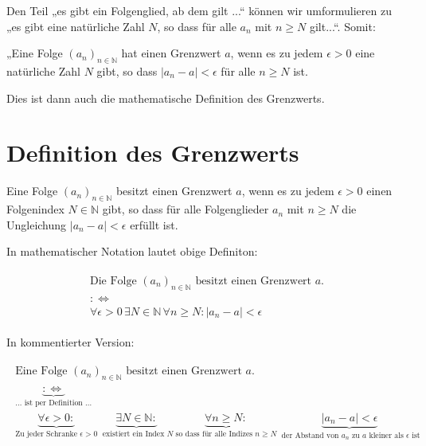 \documentclass[fontsize=9pt,
               parskip=half-,
               DIV=14,
               listof=chapterentry,
               tocflat]{scrbook}
\begin{document}
Den Teil „es gibt ein Folgenglied, ab dem gilt ...“ können wir umformulieren zu „es gibt eine natürliche Zahl $N$, so dass für alle $a_{n}$ mit $n\geq N$ gilt...“. Somit:

\begin{importantparagraph*}
„Eine Folge $\left(a_{n}\right)_{n\in \mathbb {N} }$ hat einen Grenzwert $a$, wenn es zu jedem $\epsilon >0$ eine natürliche Zahl $N$ gibt, so dass $|a_{n}-a|<\epsilon $ für alle $n\geq N$ ist.

\end{importantparagraph*}

Dies ist dann auch die mathematische Definition des Grenzwerts.

\section{Definition des Grenzwerts}

\begin{definition*}[Grenzwert]
Eine Folge $\left(a_{n}\right)_{n\in \mathbb {N} }$ besitzt einen Grenzwert $a$, wenn es zu jedem $\epsilon >0$ einen Folgenindex $N\in \mathbb {N} $ gibt, so dass für alle Folgenglieder $a_{n}$ mit $n\geq N$ die Ungleichung $|a_{n}-a|<\epsilon $ erfüllt ist.

\end{definition*}

In mathematischer Notation lautet obige Definiton:

\begin{align*}
{\begin{array}{c}{\text{Die Folge }}\left(a_{n}\right)_{n\in \mathbb {N} }{\text{ besitzt einen Grenzwert }}a.\\[1ex]:\Leftrightarrow \\[1ex]\forall \epsilon >0\,\exists N\in \mathbb {N} \,\forall n\geq N:|a_{n}-a|<\epsilon \end{array}}
\end{align*}

In kommentierter Version:

\begin{align*}
{\begin{array}{c}{\text{Eine Folge }}\left(a_{n}\right)_{n\in \mathbb {N} }{\text{ besitzt einen Grenzwert }}a.\\[2ex]\underbrace {:\Leftrightarrow } _{\ldots {\text{ ist per Definition }}\ldots }\\[4ex]\underbrace {{\underset {}{}}\forall \epsilon >0:} _{{\text{Zu jeder Schranke }}\epsilon >0}\ \underbrace {{\underset {}{}}\exists N\in \mathbb {N} :} _{{\text{ existiert ein Index }}N}\ \underbrace {{\underset {}{}}\forall n\geq N:} _{{\text{so dass für alle Indizes }}n\geq N}\ \underbrace {{\underset {}{}}|a_{n}-a|<\epsilon } _{{\text{ der Abstand von }}a_{n}{\text{ zu }}a{\text{ kleiner als }}\epsilon {\text{ ist}}}\end{array}}
\end{align*}
\end{document}

